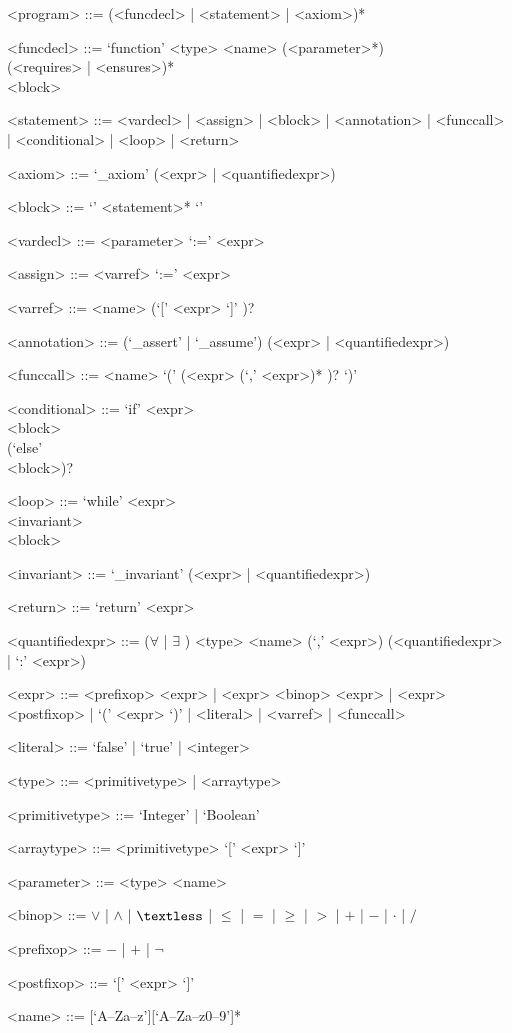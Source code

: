 \setlength{\grammarindent}{12em} %

\begin{grammar}

<program> ::= (<funcdecl> | <statement> | <axiom>)* 

<funcdecl> ::= `function' <type> <name> (<parameter>*) \\ (<requires> | <ensures>)* \\ <block>

<statement> ::= <vardecl> | <assign> | <block> | <annotation> | <funccall> | <conditional> | <loop> | <return>

<axiom> ::= `_axiom' (<expr> | <quantifiedexpr>)

<block> ::= `{' <statement>* `}'

<vardecl> ::= <parameter> `:=' <expr>

<assign> ::= <varref> `:=' <expr>

<varref> ::= <name> (`[' <expr> `]' )?

<annotation> ::= (`_assert' | `_assume') (<expr> | <quantifiedexpr>)

<funccall> ::= <name> `(' (<expr> (`,' <expr>)* )? `)'

<conditional> ::= `if' <expr> \\ <block>  \\ (`else' \\ <block>)?

<loop> ::= `while' <expr> \\ <invariant> \\ <block>

<invariant> ::= `_invariant' (<expr> | <quantifiedexpr>)

<return> ::= `return' <expr>

<quantifiedexpr> ::= ($\forall$ | $\exists$ ) <type> <name> (`,' <expr>) (<quantifiedexpr> | `:' <expr>)

<expr> ::= <prefixop> <expr> | <expr> <binop> <expr> | <expr> <postfixop> | `(' <expr> `)' | <literal> | <varref> | <funccall>

<literal> ::= `false' | `true' | <integer>

<type> ::= <primitivetype> | <arraytype>

<primitivetype> ::= `Integer' | `Boolean'

<arraytype> ::= <primitivetype> `[' <expr> `]'

<parameter> ::= <type> <name>

<binop> ::= $\vee$ | $\wedge$ | $\textless$ | $\leq$ | $=$ | $\geq$ | $>$ | $+$ | $-$ | $\cdot$ | $/$

<prefixop> ::= $-$ | $+$ | $\neg$

<postfixop> ::= `[' <expr> `]'

<name> ::=  [`A--Za--z'][`A--Za--z0--9']*

\end{grammar}

